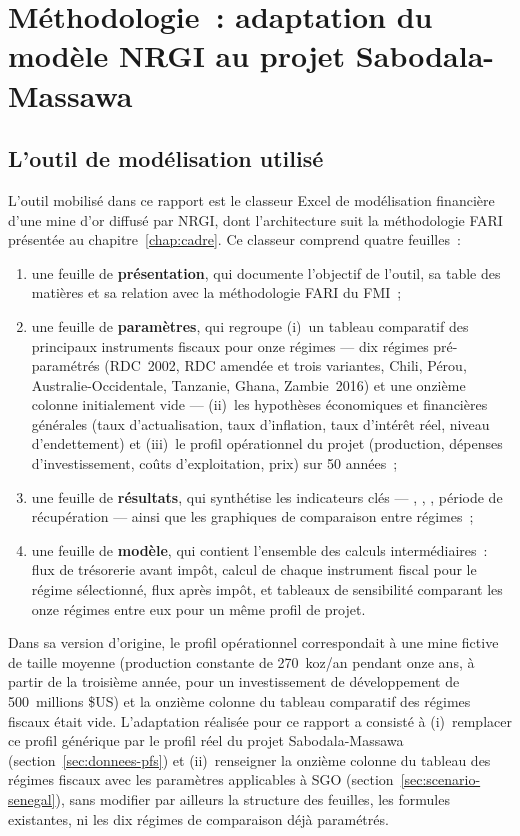 \chapter{Méthodologie~: adaptation du modèle NRGI au projet Sabodala-Massawa}
\label{chap:methodo}

\section{L'outil de modélisation utilisé}

L'outil mobilisé dans ce rapport est le classeur Excel de modélisation financière d'une mine d'or diffusé par NRGI, dont l'architecture suit la méthodologie FARI présentée au chapitre~\ref{chap:cadre}. Ce classeur comprend quatre feuilles~:

\begin{enumerate}
  \item une feuille de \textbf{présentation}, qui documente l'objectif de l'outil, sa table des matières et sa relation avec la méthodologie FARI du FMI~;
  \item une feuille de \textbf{paramètres}, qui regroupe (i)~un tableau comparatif des principaux instruments fiscaux pour onze régimes --- dix régimes pré-paramétrés (RDC~2002, RDC amendée et trois variantes, Chili, Pérou, Australie-Occidentale, Tanzanie, Ghana, Zambie~2016) et une onzième colonne initialement vide --- (ii)~les hypothèses économiques et financières générales (taux d'actualisation, taux d'inflation, taux d'intérêt réel, niveau d'endettement) et (iii)~le profil opérationnel du projet (production, dépenses d'investissement, coûts d'exploitation, prix) sur 50 années~;
  \item une feuille de \textbf{résultats}, qui synthétise les indicateurs clés --- \VAN, \TRI, \TEMI, période de récupération --- ainsi que les graphiques de comparaison entre régimes~;
  \item une feuille de \textbf{modèle}, qui contient l'ensemble des calculs intermédiaires~: flux de trésorerie avant impôt, calcul de chaque instrument fiscal pour le régime sélectionné, flux après impôt, et tableaux de sensibilité comparant les onze régimes entre eux pour un même profil de projet.
\end{enumerate}

Dans sa version d'origine, le profil opérationnel correspondait à une mine fictive de taille moyenne (production constante de 270~koz/an pendant onze ans, à partir de la troisième année, pour un investissement de développement de 500~millions \$US) et la onzième colonne du tableau comparatif des régimes fiscaux était vide. L'adaptation réalisée pour ce rapport a consisté à (i)~remplacer ce profil générique par le profil réel du projet Sabodala-Massawa (section~\ref{sec:donnees-pfs}) et (ii)~renseigner la onzième colonne du tableau des régimes fiscaux avec les paramètres applicables à SGO (section~\ref{sec:scenario-senegal}), sans modifier par ailleurs la structure des feuilles, les formules existantes, ni les dix régimes de comparaison déjà paramétrés.

